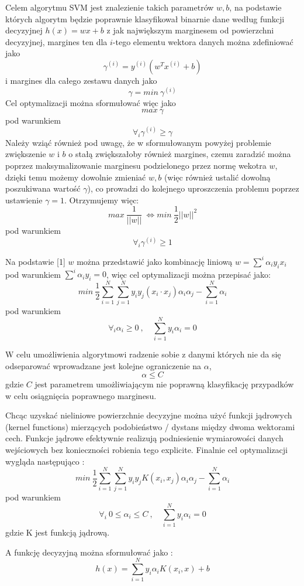 \documentclass[11pt]{article}
\begin{document}
Celem algorytmu SVM jest znalezienie takich parametrów \(w , b\), na
podstawie których algorytm będzie poprawnie klasyfikował binarnie dane
według funkcji decyzyjnej \(h(x) = wx+b\) z jak największym marginesem
od powierzchni decyzyjnej, margines ten dla \(i\)-tego elementu wektora
danych można zdefiniować jako
\[ \gamma^{(i)} = y^{(i)} (w^Tx^{(i)} + b)  \tag{1} \] i margines dla
całego zestawu danych jako \[ 
\gamma = min \ \gamma^{(i)} 
\] Cel optymalizacji można sformułować więc jako \[ max \ \gamma \] pod
warunkiem \[ \forall_{i} \gamma^{(i)} \ge \gamma \] Należy wziąć również
pod uwagę, że w sformułowanym powyżej problemie zwiększenie \(w\) i
\(b\) o stałą zwiększałoby również margines, czemu zaradzić można
poprzez maksymalizowanie marginesu podzielonego przez normę wekotra
\(w\), dzięki temu możemy dowolnie zmieniać \(w, b\) (więc również
ustalić dowolną poszukiwana wartość \(\gamma\)), co prowadzi do
kolejnego uproszczenia problemu poprzez ustawienie \(\gamma = 1\).
Otrzymujemy więc:
\[ max \ \frac{1}{||w||} \ \Leftrightarrow  min \ \frac{1}{2} ||w||^2 \tag{2} \]
pod warunkiem \[ \forall_{i} \gamma^{(i)} \ge 1 \tag{3} \]

Na podstawie {[}1{]} \(w\) można przedstawić jako kombinację liniową
\(w =\sum^{i}\alpha_i y_i x_i\) pod warunkiem
\(\sum^i \alpha_i y_i = 0\), więc cel optymalizacji można przepisać
jako:
\[ min \  \frac{1}{2} \sum^N_{i=1}\sum^N_{j=1}y_i y_j (x_i \cdot x_j) \alpha_i \alpha_j - \sum^N_{i=1}\alpha_i \tag{4} \]
pod warunkiem
\[ \forall_i \alpha_i \ge0 \ , \quad \sum^N_{i=1}y_i\alpha_i = 0 \tag{5}  \]

W celu umożliwienia algorytmowi radzenie sobie z danymi których nie da
się odseparować wprowadzane jest kolejne ograniczenie na \(\alpha\),
\[ \alpha \le C \] gdzie \(C\) jest parametrem umożliwiającym nie
poprawną klasyfikację przypadków w celu osiągnięcia poprawnego
marginesu.

Chcąc uzyskać nieliniowe powierzchnie decyzyjne można użyć funkcji
jądrowych (kernel functions) mierzących podobieństwo / dystans między
dwoma wektorami cech. Funkcje jądrowe efektywnie realizują podniesienie
wymiarowości danych wejściowych bez konieczności robienia tego
explicite. Finalnie cel optymalizacji wygląda następująco :
\[ min \  \frac{1}{2} \sum^N_{i=1}\sum^N_{j=1}y_i y_j K(x_i , x_j) \alpha_i \alpha_j - \sum^N_{i=1}\alpha_i \tag{6} \]
pod warunkiem
\[ \forall_i \ 0 \le \alpha_i \le C \ , \quad \sum^N_{i=1}y_i\alpha_i = 0 \tag{7} \]
gdzie K jest funkcją jądrową.

A funkcję decyzyjną można sformułować jako : \[
h(x) = \sum^N_{i=1}y_i\alpha_i K(x_i, x) + b \tag{8}
\]
\end{document}
